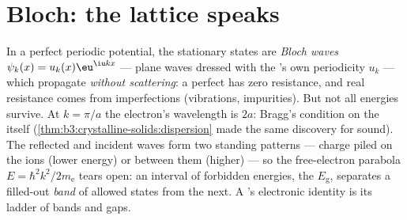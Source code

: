 \section{Bloch: the lattice speaks}

\begin{theorem}\label{thm:b3:electrons-in-solids:bloch}
In a perfect periodic potential, the stationary states are
\emph{Bloch waves} $\psi_k(x) = u_k(x)\eu^{\iu kx}$ ---
plane waves dressed with the 's own periodicity $u_k$ ---
which propagate \emph{without scattering}: a perfect  has
zero resistance, and real resistance comes from imperfections
(vibrations, impurities). But not all energies survive. At
$k = \pi/a$ the electron's wavelength is $2a$: Bragg's condition
on the  itself (\cref{thm:b3:crystalline-solids:dispersion}
made the same discovery for sound). The reflected and incident
waves form two standing patterns --- charge piled on the ions
(lower energy) or between them (higher) --- so the free-electron
parabola $E = \hbar^2k^2/2m_{\text{e}}$ tears open: an interval of
forbidden energies, the \emph{} $E_{\text{g}}$, separates
a filled-out \emph{band} of allowed states from the next. A
's electronic identity is its ladder of bands and gaps.
\end{theorem}
\admitted

